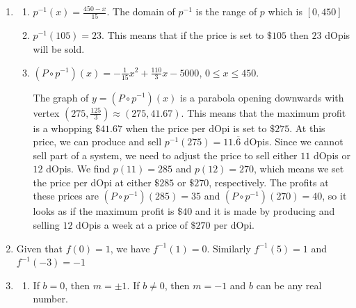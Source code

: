 \documentclass{ximera}
\begin{document}
\enlargethispage{1in}

\begin{enumerate}
\setcounter{enumi}{\value{HW}}


\item  

\begin{enumerate}

\item $p^{-1}(x) = \frac{450-x}{15}$.  The domain of $p^{-1}$ is the range of $p$ which is $[0,450]$

\item  $p^{-1}(105) = 23$. This means that if the price is set to $\$105$ then $23$ dOpis will be sold.

\item $\left(P\circ p^{-1}\right)(x) = -\frac{1}{15} x^2 + \frac{110}{3} x - 5000$, $0 \leq x \leq 450$.  

\smallskip

The graph of $y = \left(P\circ p^{-1}\right)(x)$ is a parabola opening downwards with vertex $\left(275, \frac{125}{3}\right) \approx (275, 41.67)$.  This means that the maximum profit is a whopping $\$41.67$ when the price per dOpi is set to $\$275$.   At this price, we can produce and sell $p^{-1}(275) = 11.\overline{6}$ dOpis.  Since we cannot sell part of a system, we need to adjust the price to sell either $11$ dOpis or $12$ dOpis. We find $p(11) = 285$ and $p(12) = 270$, which means we set the price per dOpi at either $\$285$ or $\$270$, respectively.  The profits at these prices are $\left(P\circ p^{-1}\right)(285) = 35$ and  $\left(P\circ p^{-1}\right)(270) = 40$, so it looks as if the maximum profit is $\$40$ and it is made by producing and selling $12$ dOpis a week at a price of $\$270$ per dOpi.

\end{enumerate}

\addtocounter{enumi}{1}

\item Given that $f(0) = 1$, we have $f^{-1}(1) = 0$.  Similarly $f^{-1}(5) = 1$ and $f^{-1}(-3) = -1$

\addtocounter{enumi}{9}

\item  \begin{enumerate} \addtocounter{enumii}{1} \item If $b =0$, then $m = \pm 1$.  If $b \neq 0$, then $m = -1$ and $b$ can be any real number. \end{enumerate}

\end{enumerate}
\end{document}
